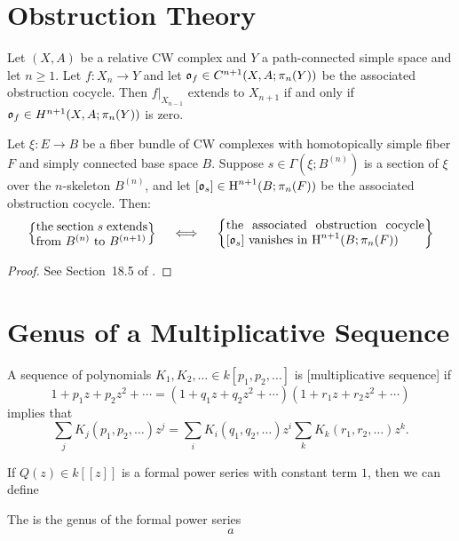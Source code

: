 \section{Obstruction Theory}

\begin{theorem}
	Let $(X,A)$ be a relative CW complex and $Y$ a path-connected simple space and let $n\geq 1$. Let $f : X_n \to Y$ and let $\mathfrak{o}_f \in C^{n+1}(X, A; \pi_n(Y))$ be the associated obstruction cocycle. Then $f|_{X_{n-1}}$ extends to $X_{n+1}$ if and only if $\mathfrak{o}_f\in H^{n+1}(X, A; \pi_n(Y))$ is zero.
\end{theorem}

\begin{theorem}
  Let $\xi : E \to B$ be a fiber bundle of CW complexes with homotopically simple fiber $F$ and simply connected base space $B$. Suppose $s\in \Gamma(\xi; B^{(n)})$ is a section of $\xi$ over the $n$-skeleton $B^{(n)}$, and let $[\mathfrak{o}_s]\in \operatorname{H}^{n+1}(B;\pi_n(F))$ be the associated obstruction cocycle. Then:
  \[
    \left\{ \parbox{9em}{the section $s$ extends from $B^{(n)}$ to $B^{(n+1)}$}\right\} \quad\iff\quad 
    \left\{\parbox{16em}{the associated obstruction cocycle $[\ofr_s]$ vanishes in $\H^{n+1}(B; \pi_n(F))$}\right\}
  \]
\end{theorem}

\begin{proof}
  See Section~18.5 of \cite{fomenko2009homotopical}.
\end{proof}

\section{Genus of a Multiplicative Sequence}

\begin{definition}
	A sequence of polynomials $K_1,K_2,\ldots \in k[p_1,p_2,\ldots]$ is [multiplicative sequence] if
	\[
		1 + p_1z + p_2z^2 + \cdots = 
		(1+q_1 z + q_2 z^2 + \cdots)
		(1+r_1 z + r_2 z^2 + \cdots)
	\]
	implies that
	\[
		\sum_j K_j(p_1,p_2,\ldots) z^j = \sum_i K_i(q_1,q_2,\ldots)z^i \sum_k K_k (r_1,r_2,\ldots) z^k.
	\]
\end{definition}

If $Q(z)\in k[\![z]\!]$ is a formal power series with constant term $1$, then we can define

\begin{definition}
	The  is the genus of the formal power series
	\[
		a
	\]
\end{definition}
